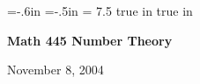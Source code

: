\def\cmb{\MidnightBlue}	  %
\def\cnb{\NavyBlue}	  %
\def\crb{\RoyalBlue}	  %
\def\cce{\Cerulean}	  %
\def\ccy{\Cyan}		  %
\def\cpb{\ProcessBlue}	  %
\def\csb{\SkyBlue}	  %
\def\ctu{\Turquoise}	  %
\def\ctb{\TealBlue}	  %
\def\caq{\Aquamarine}	  %
\def\cbg{\BlueGreen}	  %
\def\cem{\Emerald}	  %
\def\cjg{\JungleGreen}	  %
\def\csg{\SeaGreen}	  %
\def\cgg{\Green}	  %
\def\cfg{\ForestGreen}	  %
\def\cpg{\PineGreen}	  %
\def\clg{\LimeGreen}	  %
\def\cyg{\YellowGreen}	  %
\def\cspg{\SpringGreen}	  %
\def\cog{\OliveGreen}	  %
\def\pars{\RawSienna}	  %
\def\cse{\Sepia}		  %
\def\cbr{\Brown}		  %
\def\cta{\Tan}		  %
\def\cgr{\Gray}		  %
\def\cbl{\Black}		  %
\def\cwh{\White}		  %


\voffset=-.6in
\hoffset=-.5in
\hsize = 7.5 true in
 true in


\overfullrule=0pt


\def\ctln{\centerline}
\def\u{\underbar}
\def\ssk{\smallskip}
\def\msk{\medskip}
\def\bsk{\bigskip}
\def\hsk{\hskip.1in}
\def\hhsk{\hskip.2in}
\def\dsl{\displaystyle}

\def\lra{$\Leftrightarrow$ }


\ctln{\bf Math 445 Number Theory}

\smallskip

\ctln{November 8, 2004}

\medskip


